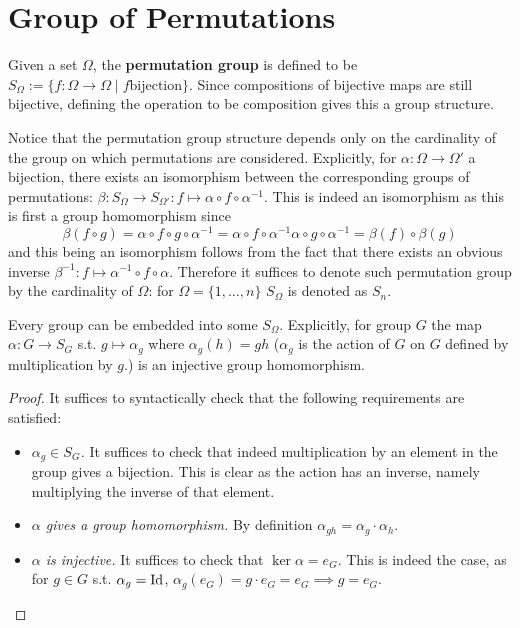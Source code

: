 \documentclass{article}
\begin{document}
\section{Group of Permutations}

\begin{definition}
    Given a set $\Omega$, the \textbf{permutation group} is defined to be $S_{\Omega} := \{f: \Omega \to \Omega \mid f \text{bijection}\}$. Since compositions of bijective maps are still bijective, defining the operation to be composition gives this a group structure.
\end{definition}

\begin{remark}
    Notice that the permutation group structure depends only on the cardinality of the group on which permutations are considered. Explicitly, for $\alpha: \Omega \to \Omega'$ a bijection, there exists an isomorphism between the corresponding groups of permutations: $\beta: S_{\Omega} \to S_{\Omega'}: f \mapsto \alpha \circ f \circ \alpha^{-1}$. This is indeed an isomorphism as this is first a group homomorphism since
    \[
        \beta(f \circ g) = \alpha \circ f \circ g \circ \alpha^{-1} = \alpha \circ f \circ \alpha^{-1} \alpha \circ g \circ \alpha^{-1} = \beta(f) \circ \beta(g)
    \]
    and this being an isomorphism follows from the fact that there exists an obvious inverse $\beta^{-1}: f \mapsto \alpha^{-1} \circ f \circ \alpha$. Therefore it suffices to denote such permutation group by the cardinality of $\Omega$: for $\Omega = \{1, \dots, n\}$ $S_{\Omega}$ is denoted as $S_n$.
\end{remark}

\begin{proposition}[Cayley]
    Every group can be embedded into some $S_{\Omega}$. Explicitly, for group $G$ the map $\alpha: G \to S_G$ s.t. $g \mapsto \alpha_g$ where $\alpha_g(h) = gh$ ($\alpha_g$ is the action of $G$ on $G$ defined by multiplication by $g$.) is an injective group homomorphism.
\end{proposition}

\begin{proof}
    It suffices to syntactically check that the following requirements are satisfied:
    \begin{itemize}
        \item \emph{$\alpha_g \in S_G$.} It suffices to check that indeed multiplication by an element in the group gives a bijection. This is clear as the action has an inverse, namely multiplying the inverse of that element. 
        \item \emph{$\alpha$ gives a group homomorphism.} By definition $\alpha_{gh} = \alpha_g \cdot \alpha_h$.
        \item \emph{$\alpha$ is injective.} It suffices to check that $\ker \alpha = e_G$. This is indeed the case, as for $g \in G$ s.t. $\alpha_g = \mathrm{Id}$, $\alpha_g(e_G) = g \cdot e_G = e_G \implies g = e_G$.
    \end{itemize}
\end{proof}
\end{document}
